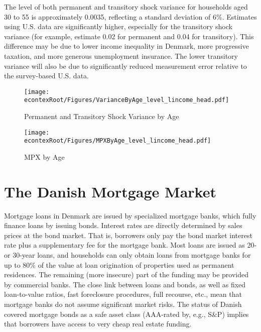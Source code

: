 \documentclass[titlepage]{\econtex}\newcommand{\texname}{ConsumptionHeterogeneity}
\begin{document}
	The level of both permanent and transitory shock variance for households aged 30 to 55 is approximately 0.0035, reflecting a standard deviation of 6\%. Estimates using U.S. data are significantly higher, especially for the transitory shock variance (for example, \cite{carroll_nature_1997} estimate 0.02 for permanent and 0.04 for transitory). This difference may be due to lower income inequality in Denmark, more progressive taxation, and more generous unemployment insurance. The lower transitory variance will also be due to significantly reduced measurement error relative to the survey-based U.S. data. 
	\begin{figure} 
		\begin{centering}
			\texttt{[image: \\econtexRoot/Figures/VarianceByAge\_level\_lincome\_head.pdf]} 
			\caption{Permanent and Transitory Shock Variance by Age}
			\label{fig:VarianceByAge}
		\end{centering}
	\end{figure}
	\begin{figure} 
		\begin{centering}
			\texttt{[image: \\econtexRoot/Figures/MPXByAge\_level\_lincome\_head.pdf]} 
			\caption{MPX by Age}
			\label{fig:MPXByAge}
		\end{centering}
	\end{figure}
	
	\section{The Danish Mortgage Market} \label{mortgage_market}
	\setcounter{figure}{0}   
	\setcounter{table}{0} 
	Mortgage loans in Denmark are issued by specialized mortgage banks, which fully finance loans by issuing bonds. Interest rates are directly determined by sales prices at the bond market. That is, borrowers only pay the bond market interest rate plus a supplementary fee for the mortgage bank. 
	Most loans are issued as 20- or 30-year loans, and households can only obtain loans from mortgage banks for up to 80\% of the value at loan origination of properties used as permanent residences. The remaining (more insecure) part of the funding may be provided by commercial banks. The close link between loans and bonds, as well as fixed loan-to-value ratios, fast foreclosure procedures, full recourse, etc., mean that mortgage banks do not assume significant market risks. The status of Danish covered mortgage bonds as a safe asset class (AAA-rated by, e.g., S\&P) implies that borrowers have access to very cheap real estate funding.
	
\end{document}
